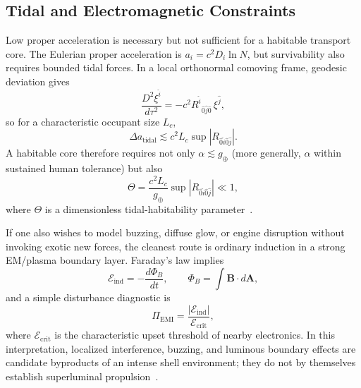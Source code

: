 \documentclass[aps,prd,twocolumn,superscriptaddress,nofootinbib,floatfix]{revtex4-2}
\begin{document}
\subsection{Tidal and Electromagnetic Constraints}\label{sec:tidal-em}

Low proper acceleration is necessary but not sufficient for a habitable
transport core. The Eulerian proper acceleration is $a_i = c^{2} D_i \ln N$, but
survivability also requires bounded tidal forces. In a local orthonormal comoving
frame, geodesic deviation gives
\begin{equation}
\frac{D^2 \xi^{\hat{i}}}{d\tau^2} =
- c^{2} R^{\hat{i}}{}_{\hat{0}\hat{j}\hat{0}}\,\xi^{\hat{j}},
\label{eq:s09-geodesic-deviation}
\end{equation}
so for a characteristic occupant size $L_c$,
\begin{equation}
\Delta a_{\mathrm{tidal}} \lesssim c^2 L_c
\sup \left|R_{\hat{0}\hat{i}\hat{0}\hat{j}}\right|.
\label{eq:s09-tidal}
\end{equation}
A habitable core therefore requires not only $\alpha \lesssim g_\oplus$ (more
generally, $\alpha$ within sustained human tolerance) but also
\begin{equation}
\Theta = \frac{c^2 L_c}{g_\oplus}
\sup \left|R_{\hat{0}\hat{i}\hat{0}\hat{j}}\right| \ll 1,
\label{eq:s09-theta}
\end{equation}
where $\Theta$ is a dimensionless tidal-habitability
parameter~\cite{MTW1973,Wald1984}.

If one also wishes to model buzzing, diffuse glow, or engine disruption without
invoking exotic new forces, the cleanest route is ordinary induction in a
strong EM/plasma boundary layer. Faraday's law implies
\begin{equation}
\mathcal{E}_{\mathrm{ind}} = -\frac{d\Phi_B}{dt},\qquad
\Phi_B = \int \mathbf{B}\cdot d\mathbf{A},
\label{eq:s09-faraday}
\end{equation}
and a simple disturbance diagnostic is
\begin{equation}
\Pi_{\mathrm{EMI}} = \frac{|\mathcal{E}_{\mathrm{ind}}|}{\mathcal{E}_{\mathrm{crit}}},
\label{eq:s09-emi}
\end{equation}
where $\mathcal{E}_{\mathrm{crit}}$ is the characteristic upset threshold of
nearby electronics. In this interpretation, localized interference, buzzing,
and luminous boundary effects are candidate byproducts of an intense shell
environment; they do not by themselves establish superluminal
propulsion~\cite{DIRD_Green,NASA_UAP2023}.
\end{document}
